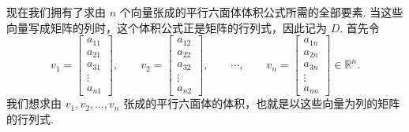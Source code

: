 现在我们拥有了求由 $n$ 个向量张成的平行六面体体积公式所需的全部要素. 当这些向量写成矩阵的列时，这个体积公式正是矩阵的行列式，因此记为 $D$. 首先令
\[
v_1=\begin{bmatrix}a_{11}\\a_{21}\\a_{31}\\\vdots\\a_{n1}\end{bmatrix},\qquad
v_2=\begin{bmatrix}a_{12}\\a_{22}\\a_{32}\\\vdots\\a_{n2}\end{bmatrix},\qquad\cdots,\qquad
v_n=\begin{bmatrix}a_{1n}\\a_{2n}\\a_{3n}\\\vdots\\a_{nn}\end{bmatrix}\in\mathbb{R}^n.
\]
我们想求由 $v_1,v_2,\ldots,v_n$ 张成的平行六面体的体积，也就是以这些向量为列的矩阵的行列式.
